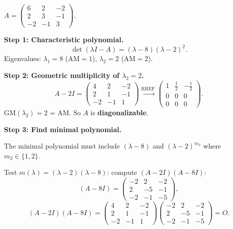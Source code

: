 \documentclass[12pt,a3paper]{article}
\begin{document}
\begin{tcolorbox}[enhanced,breakable,
  colback=cE!4,colframe=cE,boxrule=0.8pt,arc=5pt,
  title={\textbf{Answer --- Minimal Polynomial; Derogatory Check}},
  fonttitle=\bfseries\color{white},colbacktitle=cE]
 
$A = \begin{pmatrix}6&2&-2\\2&3&-1\\-2&-1&3\end{pmatrix}$.
 
\textbf{Step 1: Characteristic polynomial.}
\[
\det(\lambda I-A) = (\lambda-8)(\lambda-2)^2.
\]
Eigenvalues: $\lambda_1=8$ (AM$=1$), $\lambda_2=2$ (AM$=2$).
 
\textbf{Step 2: Geometric multiplicity of $\lambda_2=2$.}
\[
A-2I=\begin{pmatrix}4&2&-2\\2&1&-1\\-2&-1&1\end{pmatrix}
\xrightarrow{\mathrm{RREF}}\begin{pmatrix}1&\frac{1}{2}&-\frac{1}{2}\\0&0&0\\0&0&0\end{pmatrix}.
\]
GM$(\lambda_2)=2$ = AM. So $A$ is \textbf{diagonalizable}.
 
\textbf{Step 3: Find minimal polynomial.}
 
The minimal polynomial must include $(\lambda-8)$ and $(\lambda-2)^{m_2}$ where $m_2\in\{1,2\}$.
 
Test $m(\lambda)=(\lambda-2)(\lambda-8)$: compute $(A-2I)(A-8I)$:
\[
(A-8I)=\begin{pmatrix}-2&2&-2\\2&-5&-1\\-2&-1&-5\end{pmatrix},
\]
\[
(A-2I)(A-8I) = \begin{pmatrix}4&2&-2\\2&1&-1\\-2&-1&1\end{pmatrix}\begin{pmatrix}-2&2&-2\\2&-5&-1\\-2&-1&-5\end{pmatrix} = O.
\]
 

\end{tcolorbox}
\end{document}
